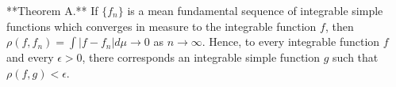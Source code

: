 **Theorem A.** If $\{f_n\}$ is a mean fundamental sequence of integrable simple functions which converges in measure to the integrable function $f$, then $\rho(f, f_n) = \int |f - f_n| d\mu \to 0$ as $n \to \infty$. Hence, to every integrable function $f$ and every $\epsilon > 0$, there corresponds an integrable simple function $g$ such that $\rho(f, g) < \epsilon$.

